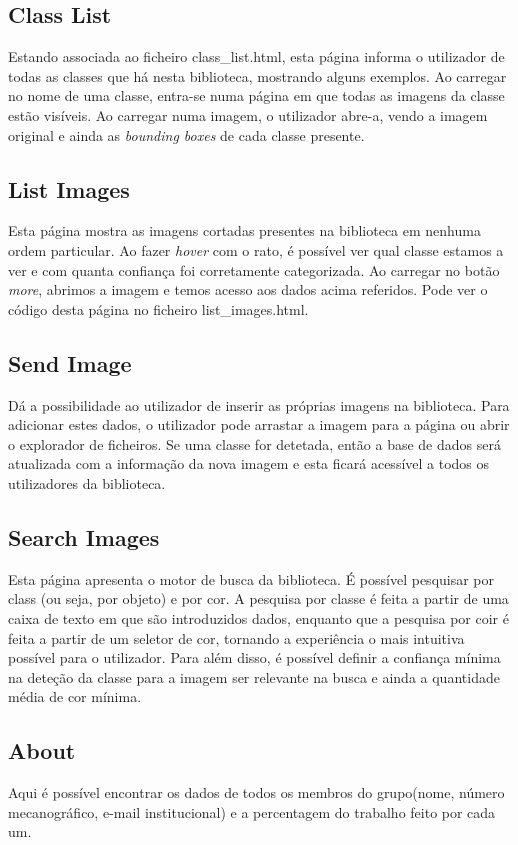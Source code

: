 \documentclass{report}
\begin{document}
\subsection{Class List}
Estando associada ao ficheiro class\_list.html, esta página informa o utilizador de todas as classes que há nesta biblioteca, mostrando alguns exemplos. Ao carregar no nome de uma classe, entra-se numa página em que todas as imagens da classe estão visíveis. Ao carregar numa imagem, o utilizador abre-a, vendo a imagem original e ainda as \textit{bounding boxes} de cada classe presente.

\subsection{List Images}
Esta página mostra as imagens cortadas presentes na biblioteca em nenhuma ordem particular. Ao fazer \textit{hover} com o rato, é possível ver qual classe estamos a ver e com quanta confiança foi corretamente categorizada. Ao carregar no botão \textit{more}, abrimos a imagem e temos acesso aos dados acima referidos. Pode ver o código desta página no ficheiro list\_images.html.

\subsection{Send Image}
Dá a possibilidade ao utilizador de inserir as próprias imagens na biblioteca. Para adicionar estes dados, o utilizador pode arrastar a imagem para a página ou abrir o explorador de ficheiros. Se uma classe for detetada, então a base de dados será atualizada com a informação da nova imagem e esta ficará acessível a todos os utilizadores da biblioteca.

\subsection{Search Images}
Esta página apresenta o motor de busca da biblioteca. É possível pesquisar por class (ou seja, por objeto) e por cor. A pesquisa por classe é feita a partir de uma caixa de texto em que são introduzidos dados, enquanto que a pesquisa por coir é feita a partir de um seletor de cor, tornando a experiência o mais intuitiva possível para o utilizador. Para além disso, é possível definir a confiança mínima na deteção da classe para a imagem ser relevante na busca e ainda a quantidade média de cor mínima.

\subsection{About}
Aqui é possível encontrar os dados de todos os membros do grupo(nome, número mecanográfico, e-mail institucional) e a percentagem do trabalho feito por cada um.
\end{document}

